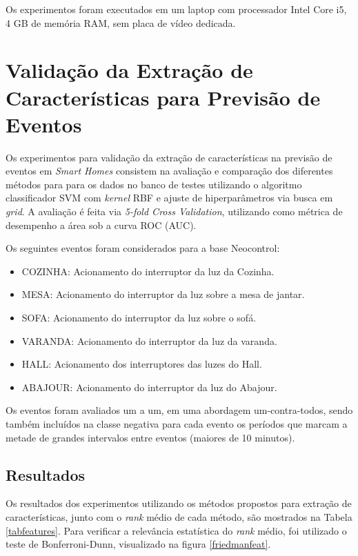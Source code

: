 \documentclass[
	12pt,				%
	openright,			%
	twoside,			%
	a4paper,			%
	english,			%
	spanish,			%
	brazil,				%
	]{abntex2}\usepackage[]{graphicx}\usepackage[]{color}
\begin{document}
Os experimentos foram executados em um laptop com processador Intel Core i5, 4 GB de memória RAM, sem placa de vídeo dedicada.

\section{Validação da Extração de Características para Previsão de Eventos}

Os experimentos para validação da extração de características na previsão de eventos em \textit{Smart Homes} consistem na avaliação e comparação dos diferentes métodos para para os dados no banco de testes utilizando o algoritmo classificador SVM com \textit{kernel} RBF e ajuste de hiperparâmetros via busca em \textit{grid}. A avaliação é feita via \textit{5-fold Cross Validation}, utilizando como métrica de desempenho a área sob a curva ROC (AUC).

Os seguintes eventos foram considerados para a base Neocontrol:

\begin{itemize}
    \item COZINHA: Acionamento do interruptor da luz da Cozinha.
    \item MESA: Acionamento do interruptor da luz sobre a mesa de jantar.
    \item SOFA: Acionamento do interruptor da luz sobre o sofá.
    \item VARANDA: Acionamento do interruptor da luz da varanda.
    \item HALL: Acionamento dos interruptores das luzes do Hall.
    \item ABAJOUR: Acionamento do interruptor da luz do Abajour.
\end{itemize}

Os eventos foram avaliados um a um, em uma abordagem um-contra-todos, sendo também incluídos na classe negativa para cada evento os períodos que marcam a metade de grandes intervalos entre eventos (maiores de 10 minutos).

\subsection{Resultados}

Os resultados dos experimentos utilizando os métodos propostos para extração de características, junto com o \textit{rank} médio de cada método, são mostrados na Tabela \ref{tabfeatures}. Para verificar a relevância estatística do \textit{rank} médio, foi utilizado o teste de Bonferroni-Dunn, visualizado na figura \ref{friedmanfeat}.
\end{document}
